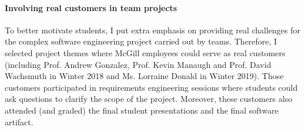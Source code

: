 

\paragraph{Involving real customers in team projects}

To better motivate students, I put extra emphasis on providing real challenges for the complex software engineering project carried out by teams. Therefore, I selected project themes where McGill employees could serve as real customers (including Prof. Andrew Gonzalez, Prof. Kevin Manaugh and Prof. David Wachsmuth in Winter 2018 and Ms. Lorraine Donald in Winter 2019). Those customers participated in requirements engineering sessions where students could ask questions to clarify the scope of the project. Moreover, these customers also attended (and graded) the final student presentations and the final software artifact.

